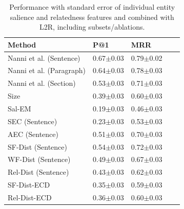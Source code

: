 \begin{table}[t]
    \caption{Performance with standard error of individual entity salience and relatedness features and combined with L2R, including subsets/ablations.}
    \label{tab:Results-shubham}
    \begin{tabular}{@{}lllll@{}}
        \toprule
        Method & P@1 & MRR \\ 
        
        \midrule
        
        Nanni et al. (Sentence) &
        0.67$\pm$0.03 & 0.79$\pm$0.02 \\
        
         Nanni et al. (Paragraph) &
        0.64$\pm$0.03  & 0.78$\pm$0.03 \\
        
         Nanni et al. (Section) &
       0.53$\pm$0.03 & 0.71$\pm$0.03 \\
     
      Size &
      0.39$\pm$0.03&
      0.60$\pm$0.03
      \\
      
      \midrule
      
     
    Sal-EM   &   
      0.19$\pm$0.03 &
      0.46$\pm$0.03
      \\
      
      
      
      SEC (Sentence)  &    
      0.23$\pm$0.03 &
      0.53$\pm$0.03
      \\
      
      
      AEC (Sentence)   &    
      0.51$\pm$0.03 &
      0.70$\pm$0.03
      \\
       \midrule
      
     
      SF-Dist (Sentence)   &    
      0.54$\pm$0.03 &
      0.72$\pm$0.03
      \\
      
     
      WF-Dist (Sentence)  &    
      0.49$\pm$0.03 &
      0.67$\pm$0.03
      \\
      
      
      Rel-Dist (Sentence)  &    
      0.43$\pm$0.03 &
     0.62$\pm$0.03
      \\
       \midrule
      
    
      SF-Dist-ECD   &    
      0.35$\pm$0.03 &
      0.59$\pm$0.03
      \\
      
      
      Rel-Dist-ECD  &    
      0.36$\pm$0.03 &
      0.60$\pm$0.03
      \\
      

\end{tabular}
\end{table}
